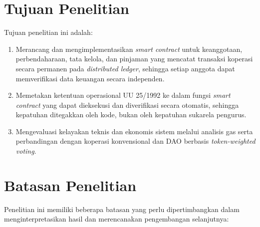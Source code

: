 \section{Tujuan Penelitian}

Tujuan penelitian ini adalah:

\begin{enumerate}
	\item Merancang dan mengimplementasikan \textit{smart contract} untuk keanggotaan, perbendaharaan, tata kelola, dan pinjaman yang mencatat transaksi koperasi secara permanen pada \textit{distributed ledger}, sehingga setiap anggota dapat memverifikasi data keuangan secara independen.
	\item Memetakan ketentuan operasional UU 25/1992 ke dalam fungsi \textit{smart contract} yang dapat dieksekusi dan diverifikasi secara otomatis, sehingga kepatuhan ditegakkan oleh kode, bukan oleh kepatuhan sukarela pengurus.
	\item Mengevaluasi kelayakan teknis dan ekonomis sistem melalui analisis gas serta perbandingan dengan koperasi konvensional dan DAO berbasis \textit{token-weighted voting}.
\end{enumerate}

\section{Batasan Penelitian}

Penelitian ini memiliki beberapa batasan yang perlu dipertimbangkan dalam menginterpretasikan hasil dan merencanakan pengembangan selanjutnya:

